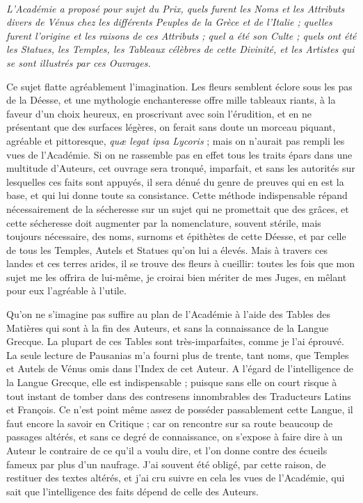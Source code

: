 \documentclass[a4paper, 11pt, oneside, polutonikogreek, french]{article}
\begin{document}
\paragraph{}
\emph{L'Académie a proposé pour sujet du Prix, quels furent les Noms et les Attributs divers de Vénus chez les différents Peuples de la Grèce et de l'Italie ; quelles furent l'origine et les raisons de ces Attributs ; quel a été son Culte ; quels ont été les Statues, les Temples, les Tableaux célèbres de cette Divinité, et les Artistes qui se sont illustrés par ces Ouvrages.}

Ce sujet flatte agréablement l'imagination. Les fleurs semblent éclore sous les pas de la Déesse, et une mythologie enchanteresse offre mille tableaux riants, à la faveur d'un choix heureux, en proscrivant avec soin l'érudition, et en ne présentant que des surfaces légères, on ferait sans doute un morceau piquant, agréable et pittoresque, \emph{quæ legat ipsa Lycoris} ; mais on n'aurait pas rempli les vues de l'Académie. Si on ne rassemble pas en effet tous les traits épars dans une multitude d'Auteurs, cet ouvrage sera tronqué, imparfait, et sans les autorités sur lesquelles ces faits sont appuyés, il sera dénué du genre de preuves qui en est la base, et qui lui donne toute sa consistance. Cette méthode indispensable répand nécessairement de la sécheresse sur un sujet qui ne promettait que des grâces, et cette sécheresse doit augmenter par la nomenclature, souvent stérile, mais toujours nécessaire, des noms, surnoms et épithètes de cette Déesse, et par celle de tous les Temples, Autels et Statues qu'on lui a élevés. Mais à travers ces landes et ces terres arides, il se trouve des fleurs à cueillir: toutes les fois que mon sujet me les offrira de lui-même, je croirai bien mériter de mes Juges, en mêlant pour eux l'agréable à l'utile.

Qu'on ne s'imagine pas suffire au plan de l'Académie à l'aide des Tables des Matières qui sont à la fin des Auteurs, et sans la connaissance de la Langue Grecque. La plupart de ces Tables sont très-imparfaites, comme je l'ai éprouvé. La seule lecture de Pausanias m'a fourni plus de trente, tant noms, que Temples et Autels de Vénus omis dans l'Index de cet Auteur. A l'égard de l'intelligence de la Langue Grecque, elle est indispensable ; puisque sans elle on court risque à tout instant de tomber dans des contresens innombrables des Traducteurs Latins et François. Ce n'est point même assez de posséder passablement cette Langue, il faut encore la savoir en Critique ; car on rencontre sur sa route beaucoup de passages altérés, et sans ce degré de connaissance, on s'expose à faire dire à un Auteur le contraire de ce qu'il a voulu dire, et l'on donne contre des écueils fameux par plus d'un naufrage. J'ai souvent été obligé, par cette raison, de restituer des textes altérés, et j'ai cru suivre en cela les vues de l'Académie, qui sait que l'intelligence des faits dépend de celle des Auteurs.
\end{document}
